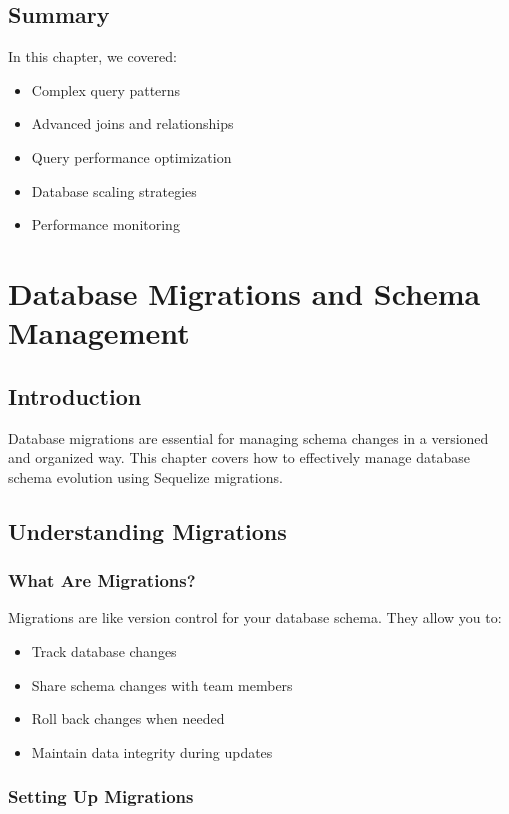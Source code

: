 \documentclass[12pt,a4paper]{book}
\begin{document}
	\section{Summary}
	In this chapter, we covered:
	\begin{itemize}
		\item Complex query patterns
		\item Advanced joins and relationships
		\item Query performance optimization
		\item Database scaling strategies
		\item Performance monitoring
	\end{itemize}
	
	\chapter{Database Migrations and Schema Management}
	
	\section{Introduction}
	Database migrations are essential for managing schema changes in a versioned and organized way. This chapter covers how to effectively manage database schema evolution using Sequelize migrations.
	
	\section{Understanding Migrations}
	
	\subsection{What Are Migrations?}
	\begin{tcolorbox}[title=Migration Basics]
		Migrations are like version control for your database schema. They allow you to:
		\begin{itemize}
			\item Track database changes
			\item Share schema changes with team members
			\item Roll back changes when needed
			\item Maintain data integrity during updates
		\end{itemize}
	\end{tcolorbox}
	
	\subsection{Setting Up Migrations}
	
\end{document}
